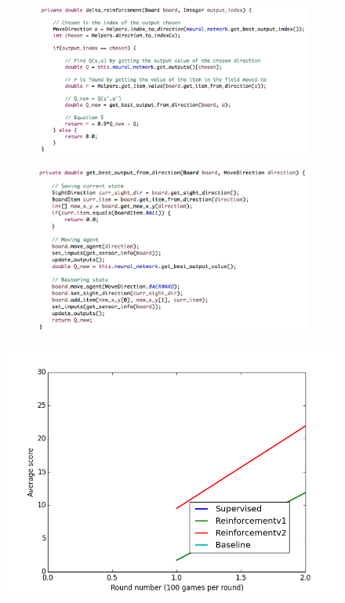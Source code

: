 \documentclass{article}
\begin{document}
\begin{figure}[h]
  \centering
  \begin{subfigure}{.5\textwidth}
    \centering
    \includegraphics[width=1\linewidth]{png/delta_reinforcement.png}
  \end{subfigure}%
  \begin{subfigure}{.5\textwidth}
    \centering
    \includegraphics[width=1\linewidth]{png/q_new.png}
  \end{subfigure}
\end{figure}

\vspace{-1cm}

\begin{figure}[h!]
  \centering
  \includegraphics[scale=.5]{png/results.png}
\end{figure}
\end{document}
